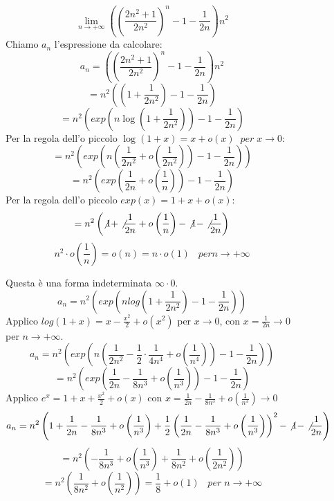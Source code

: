 \documentclass[a4paper]{article}
\theoremstyle{break}
\theoremstyle{break}
\theoremstyle{break}
\theoremstyle{break}
\begin{document}
\begin{figure}[H]
  \begin{exercise}
    \[
      \lim_{n \to +\infty} \left( \left( \frac{2n^2+1}{2n^2} \right)^n -1-\frac{1}{2n} \right) n^2
    \] 
    Chiamo \( a_n \) l'espressione da calcolare: 
    \[
      a_n = \left( \left( \frac{2n^2+1}{2n^2} \right)^n -1-\frac{1}{2n} \right) n^2
    \] 
    \[
      = n^2 \left( \left( 1 + \frac{1}{2n^2} \right) -1-\frac{1}{2n} \right)
    \] 
    \[
      = n^2 \left( exp\left(n\log\left(1+\frac{1}{2n^2}\right) \right) -1-\frac{1}{2n} \right)
    \] 
    Per la regola dell'o piccolo \( \log(1+x) = x +o(x) \;\; per\; x \to 0 \):
    \[
      = n^2 \left( exp \left( n \left( \frac{1}{2n^2} + o \left( \frac{1}{2n^2} \right)  \right) -1 -\frac{1}{2n} \right)  \right) 
    \] 
    \[
      = n^2 \left( exp \left( \frac{1}{2n} + o \left( \frac{1}{n} \right)  \right) -1 - \frac{1}{2n} \right) 
    \] 
    Per la regola dell'o piccolo \( exp(x) = 1 + x + o(x) \):
    \[
      = n^2 \left( \not1 + \not\frac{1}{2n} + o \left( \frac{1}{n} \right) -\not1 -\not\frac{1}{2n} \right) 
    \] 
    \[
      n^2 \cdot o \left( \frac{1}{n} \right) = o(n) = n \cdot o(1)\;\;\; per n \to +\infty
    \] 

    Questa è una forma indeterminata \( \infty \cdot 0 \).
    \[
      a_n = n^2 \left( exp \left( n log \left( 1+\frac{1}{2n^2} \right) -1 -\frac{1}{2n} \right)  \right) 
    \] 
    Applico \( log(1+x) = x - \frac{x^2}{2} + o(x^2) \) per \( x \to 0 \), con \( x = \frac{1}{2n} \to 0 \) 
    per \( n \to +\infty \).
    \[
      a_n = n^2 \left( exp \left( n \left( \frac{1}{2n^2} - \frac{1}{2} \cdot \frac{1}{4n^4} + o \left( \frac{1}{n^4} \right)  \right) -1 -\frac{1}{2n} \right)  \right) 
    \] 
    \[
      = n^2 \left( exp \left( \frac{1}{2n} - \frac{1}{8n^3} + o \left( \frac{1}{n^3} \right)  \right) -1 -\frac{1}{2n} \right) 
    \] 
    Applico \( e^x = 1 + x + \frac{x^2}{2} + o(x) \) con \( x = \frac{1}{2n} - \frac{1}{8n^3}+ o(\frac{1}{n^3}) \to 0 \) 
    \small\[
      a_n = n^2 \left( 1 + \frac{1}{2n} - \frac{1}{8n^3} + o \left( \frac{1}{n^3} \right) + \frac{1}{2} \left( \frac{1}{2n} - \frac{1}{8n^3} + o \left( \frac{1}{n^3} \right)  \right)^2 -\not1 -\not\frac{1}{2n}  \right) 
    \] 
    \[
      = n^2 \left( -\frac{1}{8n^3} + o \left( \frac{1}{n^3} \right) + \frac{1}{8n^2} + o \left( \frac{1}{2n^2} \right)  \right) 
    \] 
    \[
      = n^2 \left( \frac{1}{8n^2} + o \left( \frac{1}{n^2} \right)  \right) = \frac{1}{8} + o(1) \;\;\; per\; n \to +\infty
    \] 
  \end{exercise}
\end{figure}
\end{document}
